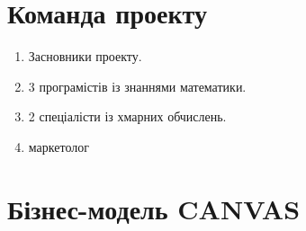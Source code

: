 \section{Команда проекту}
\begin{enumerate}
  \item Засновники проекту.
  \item 3 програмістів із знаннями математики.
  \item 2 спеціалісти із хмарних обчислень.
  \item маркетолог
\end{enumerate}

\section{Бізнес-модель CANVAS}

\hspace{10pt}
